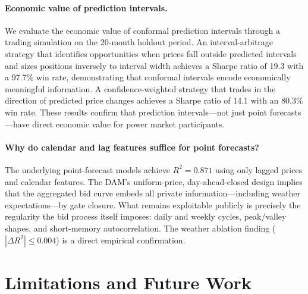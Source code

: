 \documentclass[preprint,12pt]{elsarticle}
\begin{document}
\begin{enumerate}
\paragraph{Economic value of prediction intervals.}
We evaluate the economic value of conformal prediction intervals through a trading simulation on the 20-month holdout period. An interval-arbitrage strategy that identifies opportunities when prices fall outside predicted intervals and sizes positions inversely to interval width achieves a Sharpe ratio of 19.3 with a 97.7\% win rate, demonstrating that conformal intervals encode economically meaningful information. A confidence-weighted strategy that trades in the direction of predicted price changes achieves a Sharpe ratio of 14.1 with an 80.3\% win rate. These results confirm that prediction intervals---not just point forecasts---have direct economic value for power market participants.

\paragraph{Why do calendar and lag features suffice for point forecasts?}
The underlying point-forecast models achieve $R^2=0.871$ using only lagged prices and calendar features. The DAM's uniform-price, day-ahead-closed design implies that the aggregated bid curve embeds all private information---including weather expectations---by gate closure. What remains exploitable publicly is precisely the regularity the bid process itself imposes: daily and weekly cycles, peak/valley shapes, and short-memory autocorrelation. The weather ablation finding ($|\Delta R^2| \le 0.004$) is a direct empirical confirmation.

\section{Limitations and Future Work}\label{sec:limitations}


\end{enumerate}
\end{document}
